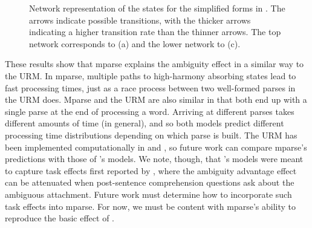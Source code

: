 \documentclass[a4paper, 12pt]{article}
\begin{document}
\begin{figure}[htbp]
\caption{Network representation of the states for the simplified forms in
    \protect\Last. The arrows indicate possible transitions, with the thicker
    arrows indicating a higher transition rate than the thinner arrows. The top
    network corresponds to \protect\Last (a) and the lower network to
    \protect\Last (c).}\label{fig:aanetworks}
\end{figure}

These results show that mparse explains the ambiguity effect in a similar
way to the URM. In mparse, multiple paths to high-harmony absorbing states lead
to fast processing times, just as a race process between two well-formed parses
in the URM does. Mparse and the URM are also similar in that both end up with a
single parse at the end of processing a word. Arriving at different parses
takes different amounts of time (in general), and so both models predict
different processing time distributions depending on which parse is built. The
URM has been implemented computationally in \citet{logacev2015multiple} and
\citet{logacev2016understanding}, so future work can compare mparse's
predictions with those of \citeauthor{logacev2015multiple}'s models. We note,
though, that \citeauthor{logacev2015multiple}'s models were meant to capture
task effects first reported by \citet{swets2008underspecification}, where the
ambiguity advantage effect can be attenuated when post-sentence comprehension
questions ask about the ambiguous attachment. Future work must determine how to
incorporate such task effects into mparse. For now, we must be content with
mparse's ability to reproduce the basic effect of \citet{traxler1998adjunct}.
\end{document}
